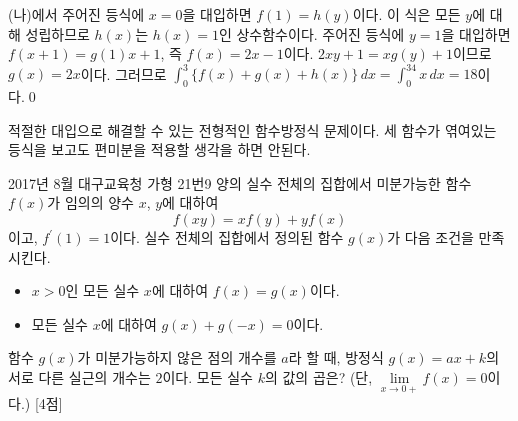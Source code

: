 \documentclass{article}
\begin{document}
\begin{sol}
	(나)에서 주어진 등식에 $x=0$을 대입하면 $f(1)=h(y)$이다. 이 식은 모든 $y$에 대해 성립하므로 $h(x)$는 $h(x)=1$인 상수함수이다. 주어진 등식에 $y=1$을 대입하면 $f(x+1)=g(1)x+1$, 즉 $f(x)=2x-1$이다. $2xy+1=xg(y)+1$이므로 $g(x)=2x$이다. 그러므로 $\displaystyle\int_0^3\{f(x)+g(x)+h(x)\}\,dx=\int_0^34x\,dx=18$이다.\qed
\end{sol}

\begin{remark}
	적절한 대입으로 해결할 수 있는 전형적인 함수방정식 문제이다. 세 함수가 엮여있는 등식을 보고도 편미분을 적용할 생각을 하면 안된다.
\end{remark}

\newpage
\begin{prob}{2017년 8월 대구교육청 가형 21번}{9}
	양의 실수 전체의 집합에서 미분가능한 함수 $f(x)$가 임의의 양수 $x$, $y$에 대하여
	\[
		f(xy)=xf(y)+yf(x)
	\]
	이고, $f^\prime(1)=1$이다. 실수 전체의 집합에서 정의된 함수 $g(x)$가 다음 조건을 만족시킨다.
	\begin{hint}
		\begin{itemize}
			\item[(가)] $x>0$인 모든 실수 $x$에 대하여 $f(x)=g(x)$이다.
			\item[(나)] 모든 실수 $x$에 대하여 $g(x)+g(-x)=0$이다.
		\end{itemize}
	\end{hint}
	함수 $g(x)$가 미분가능하지 않은 점의 개수를 $a$라 할 때, 방정식 $g(x)=ax+k$의 서로 다른 실근의 개수는 $2$이다. 모든 실수 $k$의 값의 곱은? (단, $\lim\limits_{x\to0+}f(x)=0$이다.) [4점]
\end{prob}
\end{document}
